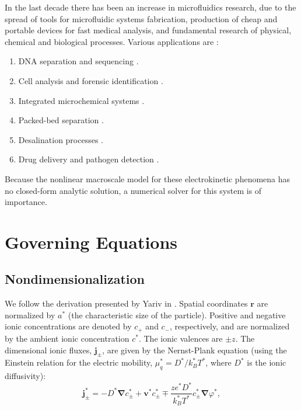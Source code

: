 \documentclass[MSc,beforeExam]{iitcsthesis}
\newcommand\bnabla{\boldsymbol{\nabla}}
\newcommand\bv{\boldsymbol{v}}
\newcommand\bj{\boldsymbol{j}}
\newcommand\br{\boldsymbol{r}}
\begin{document}
In the last decade there has been an increase in microfluidics research, 
due to the spread of tools for microfluidic systems fabrication, 
production of cheap and portable devices for fast medical analysis, 
and fundamental research of physical, chemical and biological processes.
Various applications are \cite{whitesides2006origins, erickson2004integrated, squires2005microfluidics, hardt2007microfluidic}:
\begin{enumerate}
\item DNA separation and sequencing \cite{wainright2003preconcentration}.
\item Cell analysis and forensic identification \cite{wu2004chemical, weinberger1993practical, horsman2007forensic}.
\item Integrated microchemical systems \cite{kothare2006dynamics}.
\item Packed-bed separation \cite{leinweber2004, losey2001microfabricated}.
\item Desalination processes \cite{kim2010direct}.
\item Drug delivery and pathogen detection \cite{santini2000microchips}.
\end{enumerate}

Because the nonlinear macroscale model for these electrokinetic
phenomena has no closed-form analytic solution, a numerical
solver for this system is of importance.

\section{Governing Equations} \label{sec:equations}

\subsection{Nondimensionalization}
We follow the derivation presented by Yariv in \cite{yariv2010asymptotic}.
Spatial coordinates $\br$ are normalized by $a^*$ 
(the characteristic size of the particle).
Positive and negative ionic concentrations are denoted by $c_+$ and $c_-$, respectively, and
are normalized by the ambient ionic concentration $c^*$. The ionic valences are $\pm z$.
The dimensional ionic fluxes, $\bj_\pm$, are given by the Nernst-Plank equation 
(using the Einstein relation for the electric mobility, $\mu_q^* = D^* / k_B^* T^*$, 
where $D^*$ is the ionic diffusivity):
\begin{equation}
\bj^*_\pm = 
-D^* \bnabla c^*_\pm + \bv^* c^*_\pm \mp \frac{z e^* D^*}{k_B^* T^*} c^*_\pm \bnabla \varphi^*,
\end{equation}
\end{document}
